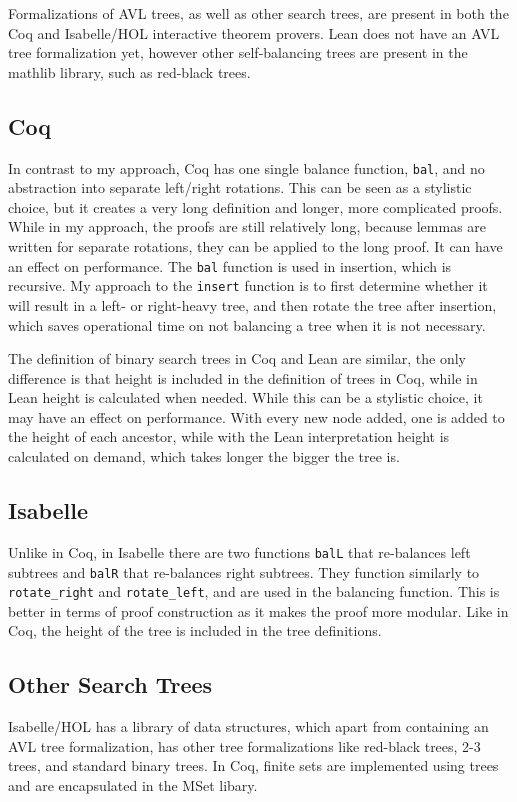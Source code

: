 Formalizations of AVL trees, as well as other search trees, are present in both the Coq \cite{code:coq} and Isabelle/HOL \cite{isabelle} interactive theorem provers. Lean does not have an AVL tree formalization yet, however other self-balancing trees are present in the mathlib library, such as red-black trees.

\subsection*{Coq}
In contrast to my approach, Coq has one single balance function, \lstinline{bal}, and no abstraction into separate left/right rotations. This can be seen as a stylistic choice, but it creates a very long definition and longer, more complicated proofs. While in my approach, the proofs are still relatively long, because lemmas are written for separate rotations, they can be applied to the long proof. It can have an effect on performance. The \lstinline{bal} function is used in insertion, which is recursive. My approach to the \lstinline{insert} function is to first determine whether it will result in a left- or right-heavy tree, and then rotate the tree after insertion, which saves operational time on not balancing a tree when it is not necessary.  

The definition of binary search trees in Coq and Lean are similar, the only difference is that height is included in the definition of trees in Coq, while in Lean height is calculated when needed. While this can be a stylistic choice, it may have an effect on performance. With every new node added, one is added to the height of each ancestor, while with the Lean interpretation height is calculated on demand, which takes longer the bigger the tree is.

\subsection*{Isabelle}
Unlike in Coq, in Isabelle there are two functions \lstinline{balL} that re-balances left subtrees and \lstinline{balR} that re-balances right subtrees. They function similarly to \lstinline{rotate_right} and \lstinline{rotate_left}, and are used in the balancing function. This is better in terms of proof construction as it makes the proof more modular. Like in Coq, the height of the tree is included in the tree definitions.

\subsection*{Other Search Trees}
Isabelle/HOL has a library of data structures, which apart from containing an AVL tree formalization, has other tree formalizations like red-black trees, 2-3 trees, and standard binary trees. In Coq, finite sets are implemented using trees and are encapsulated in the MSet libary. 

